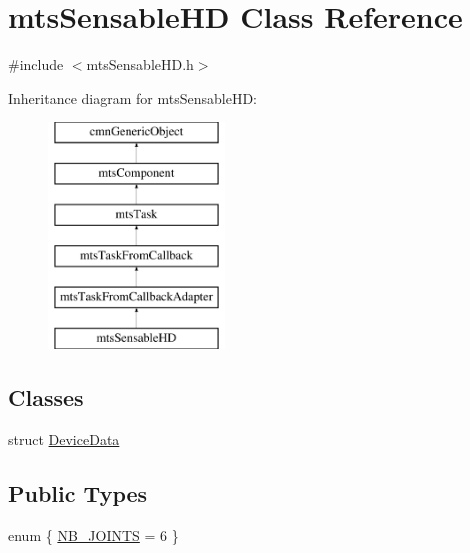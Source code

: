\hypertarget{classmts_sensable_h_d}{\section{mts\-Sensable\-H\-D Class Reference}
\label{classmts_sensable_h_d}
}


{\ttfamily \#include $<$mts\-Sensable\-H\-D.\-h$>$}

Inheritance diagram for mts\-Sensable\-H\-D\-:\begin{figure}[H]
\begin{center}
\leavevmode
\includegraphics[height=6.000000cm]{d1/d8f/classmts_sensable_h_d}
\end{center}
\end{figure}
\subsection*{Classes}
\begin{DoxyCompactItemize}
\item 
struct \hyperlink{structmts_sensable_h_d_1_1_device_data}{Device\-Data}
\end{DoxyCompactItemize}
\subsection*{Public Types}
\begin{DoxyCompactItemize}
\item 
enum \{ \hyperlink{classmts_sensable_h_d_a1023655dd86fc678efe5faa9875227e5aa92e43e72ff821fcb7bb36577c22cab4}{N\-B\-\_\-\-J\-O\-I\-N\-T\-S} = 6
 \}
\end{DoxyCompactItemize}
